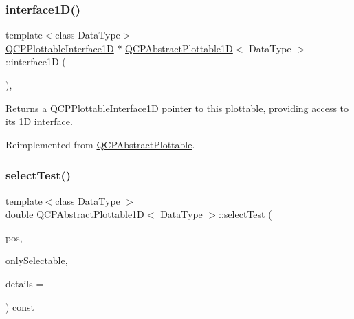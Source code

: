 \subsubsection{\texorpdfstring{interface1\+D()}{interface1D()}\hspace{0.1cm}{\footnotesize\ttfamily [2/2]}}
{\footnotesize\ttfamily template$<$class Data\+Type$>$ \\
\hyperlink{class_q_c_p_plottable_interface1_d}{Q\+C\+P\+Plottable\+Interface1D} $\ast$ \hyperlink{class_q_c_p_abstract_plottable1_d}{Q\+C\+P\+Abstract\+Plottable1D}$<$ Data\+Type $>$\+::interface1D (\begin{DoxyParamCaption}{ }\end{DoxyParamCaption})\hspace{0.3cm}{\ttfamily [inline]}, {\ttfamily [virtual]}}

Returns a \hyperlink{class_q_c_p_plottable_interface1_d}{Q\+C\+P\+Plottable\+Interface1D} pointer to this plottable, providing access to its 1D interface.

Reimplemented from \hyperlink{class_q_c_p_abstract_plottable_a81fd9fd5c4f429c074785e2eb238a8e7}{Q\+C\+P\+Abstract\+Plottable}.

\mbox{\label{class_q_c_p_abstract_plottable1_d_a071e2df66ba1746067dfcb5e27947b43}} 
\subsubsection{\texorpdfstring{select\+Test()}{selectTest()}\hspace{0.1cm}{\footnotesize\ttfamily [1/2]}}
{\footnotesize\ttfamily template$<$class Data\+Type $>$ \\
double \hyperlink{class_q_c_p_abstract_plottable1_d}{Q\+C\+P\+Abstract\+Plottable1D}$<$ Data\+Type $>$\+::select\+Test (\begin{DoxyParamCaption}\item[{const Q\+PointF \&}]{pos,  }\item[{bool}]{only\+Selectable,  }\item[{Q\+Variant $\ast$}]{details = {} }\end{DoxyParamCaption}) const\hspace{0.3cm}{\ttfamily [virtual]}}

